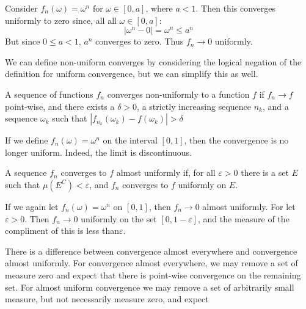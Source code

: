     \begin{example}
        Consider $f_{n}(\omega)=\omega^{n}$ for
        $\omega\in[0,a]$, where $a<1$. Then this
        converges uniformly to zero since, all all
        $\omega\in[0,a]$:
        \begin{equation}
            |\omega^{n}-0|=\omega^{n}\leq{a}^{n}
        \end{equation}
        But since $0\leq{a}<1$, $a^{n}$ converges to
        zero. Thus $f_{n}\rightarrow{0}$ uniformly.
    \end{example}
    We can define non-uniform converges by considering
    the logical negation of the definition for
    uniform convergence, but we can simplify this as
    well.
    \begin{theorem}
        A sequence of functions $f_{n}$ converges
        non-uniformly to a function $f$ if
        $f_{n}\rightarrow{f}$ point-wise, and there
        exists a $\delta>0$, a strictly increasing
        sequence $n_{k}$, and a sequence $\omega_{k}$
        such that
        $|f_{n_{k}}(\omega_{k})-f(\omega_{k})|>\delta$
    \end{theorem}
    \begin{example}
        If we define $f_{n}(\omega)=\omega^{n}$ on the
        interval $[0,1]$, then the convergence is no
        longer uniform. Indeed, the limit is
        discontinuous.
    \end{example}
    \begin{definition}
        A sequence $f_{n}$ converges to $f$ almost
        uniformly if, for all $\varepsilon>0$ there is
        a set $E$ such that $\mu(E^{C})<\varepsilon$,
        and $f_{n}$ converges to $f$ uniformly on
        $E$.
    \end{definition}
    \begin{example}
        If we again let $f_{n}(\omega)=\omega^{n}$ on
        $[0,1]$, then $f_{n}\rightarrow{0}$
        almost uniformly. For let $\varepsilon>0$. Then
        $f_{n}\rightarrow{0}$ uniformly on the set
        $[0,1-\varepsilon]$, and the measure of the
        compliment of this is less than$ \varepsilon$.
    \end{example}
    There is a difference between convergence almost
    everywhere and convergence almost uniformly. For
    convergence almost everywhere, we may remove a set
    of measure zero and expect that there is point-wise
    convergence on the remaining set. For almost uniform
    convergence we may remove a set of arbitrarily small
    measure, but not necessarily measure zero, and expect
